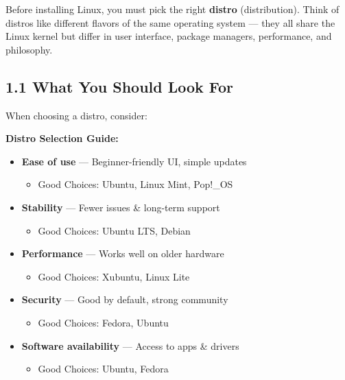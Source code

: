 \documentclass[12pt]{article}
\begin{document}
Before installing Linux, you must pick the right \textbf{distro} (distribution). Think of distros like different flavors of the same operating system — they all share the Linux kernel but differ in user interface, package managers, performance, and philosophy.

\subsection*{1.1 What You Should Look For}

When choosing a distro, consider:

\begin{infobox}
\textbf{Distro Selection Guide:}
\begin{itemize}
    \item \textbf{Ease of use} — Beginner-friendly UI, simple updates
    \begin{itemize}
        \item Good Choices: Ubuntu, Linux Mint, Pop!\_OS
    \end{itemize}
    
    \item \textbf{Stability} — Fewer issues \& long-term support
    \begin{itemize}
        \item Good Choices: Ubuntu LTS, Debian
    \end{itemize}
    
    \item \textbf{Performance} — Works well on older hardware
    \begin{itemize}
        \item Good Choices: Xubuntu, Linux Lite
    \end{itemize}
    
    \item \textbf{Security} — Good by default, strong community
    \begin{itemize}
        \item Good Choices: Fedora, Ubuntu
    \end{itemize}
    
    \item \textbf{Software availability} — Access to apps \& drivers
    \begin{itemize}
        \item Good Choices: Ubuntu, Fedora
    \end{itemize}
\end{itemize}
\end{infobox}
\end{document}
